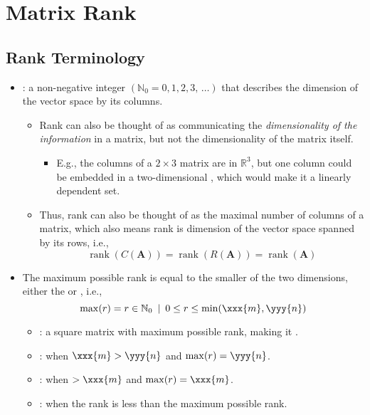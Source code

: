 \chapter{Matrix Rank}\label{Matrix Rank}
\section{Rank Terminology}\label{Rank Terminology}
\begin{itemize}
  \item {}: a non-negative integer \((\mathbb{N}_0 = 0, 1, 2, 3,\,\dots)\) that describes the dimension of the vector space \hyperref[Span]{} by its columns.
    \begin{itemize}
      \item Rank can also be thought of as communicating the \emph{dimensionality of the information} in a matrix, but not the dimensionality of the matrix itself.
      \begin{itemize}
        \item E.g., the columns of a \(2\times 3\) matrix are in \(\mathbb{R}^3\), but one column could be embedded in a two-dimensional \hyperref[Subspace]{}, which would make it a linearly dependent set.
      \end{itemize}
      \item Thus, rank can also be thought of as the maximal number of \hyperref[Linear Independence]{} columns of a matrix, which also means rank is dimension of the vector space spanned by its rows, i.e.,
      \[%
      \operatorname{rank}(C(\bm{A})) = \operatorname{rank}(R(\bm{A})) = \operatorname{rank}(\bm{A})
      \]%
    \end{itemize}
  \item The maximum possible rank is equal to the smaller of the two dimensions, either the  or , i.e.,
  \[%
  \max(r) = r \in \mathbb{N}_0~\,|~\,0 \leq r \leq \min(\xxx{m},\yyy{n})
  \]%
    \begin{itemize}
      \item {}: a square matrix with maximum possible rank, making it \hyperref[Matrix Inverse]{}. 
      \item {}: when \(\xxx{m} > \yyy{n}\) and \(\max(r) = \yyy{n}\). 
      \item {}: when \( > \xxx{m} \) and \(\max(r) = \xxx{m}\). 
      \item {}: when the rank is less than the maximum possible rank. 
    \end{itemize}
  

\end{itemize}
